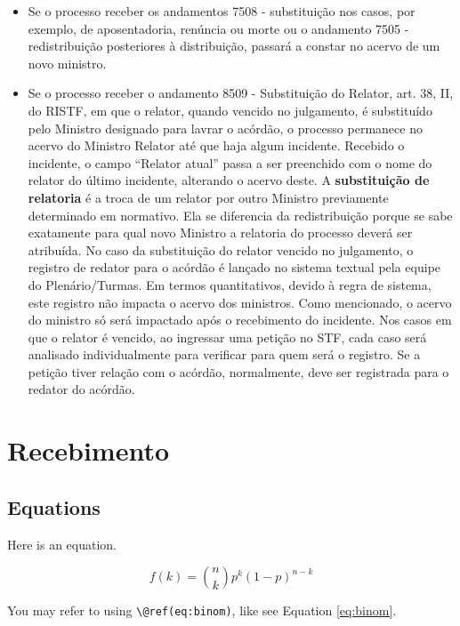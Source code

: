 \documentclass[
]{book}
\providecommand{\tightlist}{%
  \setlength{\itemsep}{0pt}\setlength{\parskip}{0pt}}
\theoremstyle{definition}
\theoremstyle{definition}
\theoremstyle{definition}
\theoremstyle{definition}
\theoremstyle{remark}
\begin{document}
\begin{itemize}
\tightlist
\item
  Se o processo receber os andamentos 7508 - substituição nos casos, por exemplo, de aposentadoria, renúncia ou morte ou o andamento 7505 - redistribuição posteriores à distribuição, passará a constar no acervo de um novo ministro.
\item
  Se o processo receber o andamento 8509 - Substituição do Relator, art. 38, II, do RISTF, em que o relator, quando vencido no julgamento, é substituído pelo Ministro designado para lavrar o acórdão, o processo permanece no acervo do Ministro Relator até que haja algum incidente. Recebido o incidente, o campo ``Relator atual'' passa a ser preenchido com o nome do relator do último incidente, alterando o acervo deste.
  A \textbf{substituição de relatoria} é a troca de um relator por outro Ministro previamente determinado em normativo. Ela se diferencia da redistribuição porque se sabe exatamente para qual novo Ministro a relatoria do processo deverá ser atribuída.
  No caso da substituição do relator vencido no julgamento, o registro de redator para o acórdão é lançado no sistema textual pela equipe do Plenário/Turmas. Em termos quantitativos, devido à regra de sistema, este registro não impacta o acervo dos ministros. Como mencionado, o acervo do ministro só será impactado após o recebimento do incidente. Nos casos em que o relator é vencido, ao ingressar uma petição no STF, cada caso será analisado individualmente para verificar para quem será o registro. Se a petição tiver relação com o acórdão, normalmente, deve ser registrada para o redator do acórdão.
\end{itemize}

\hypertarget{recebimento}{%
\chapter{Recebimento}\label{recebimento}}

\hypertarget{equations}{%
\section{Equations}\label{equations}}

Here is an equation.

\begin{equation} 
  f\left(k\right) = \binom{n}{k} p^k\left(1-p\right)^{n-k}
  \label{eq:binom}
\end{equation}

You may refer to using \texttt{\textbackslash{}@ref(eq:binom)}, like see Equation \eqref{eq:binom}.
\end{document}
